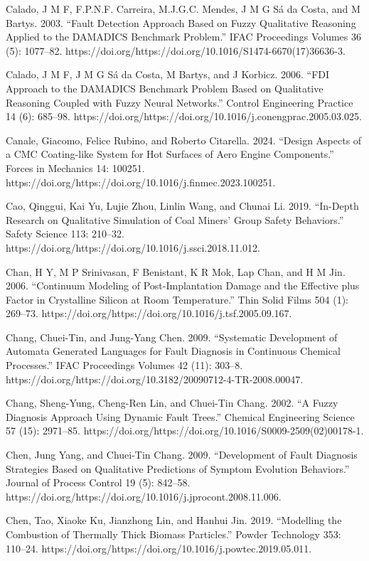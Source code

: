 \documentclass[utf8]{gradu3}
\begin{document}
Calado, J M F, F.P.N.F. Carreira, M.J.G.C. Mendes, J M G Sá da Costa, and M Bartys. 2003. “Fault Detection Approach Based on Fuzzy Qualitative Reasoning Applied to the DAMADICS Benchmark Problem.” IFAC Proceedings Volumes 36 (5): 1077–82. https://doi.org/https://doi.org/10.1016/S1474-6670(17)36636-3.

Calado, J M F, J M G Sá da Costa, M Bartys, and J Korbicz. 2006. “FDI Approach to the DAMADICS Benchmark Problem Based on Qualitative Reasoning Coupled with Fuzzy Neural Networks.” Control Engineering Practice 14 (6): 685–98. https://doi.org/https://doi.org/10.1016/j.conengprac.2005.03.025.

Canale, Giacomo, Felice Rubino, and Roberto Citarella. 2024. “Design Aspects of a CMC Coating-like System for Hot Surfaces of Aero Engine Components.” Forces in Mechanics 14: 100251. https://doi.org/https://doi.org/10.1016/j.finmec.2023.100251.

Cao, Qinggui, Kai Yu, Lujie Zhou, Linlin Wang, and Chunai Li. 2019. “In-Depth Research on Qualitative Simulation of Coal Miners’ Group Safety Behaviors.” Safety Science 113: 210–32. https://doi.org/https://doi.org/10.1016/j.ssci.2018.11.012.

Chan, H Y, M P Srinivasan, F Benistant, K R Mok, Lap Chan, and H M Jin. 2006. “Continuum Modeling of Post-Implantation Damage and the Effective plus Factor in Crystalline Silicon at Room Temperature.” Thin Solid Films 504 (1): 269–73. https://doi.org/https://doi.org/10.1016/j.tsf.2005.09.167.

Chang, Chuei-Tin, and Jung-Yang Chen. 2009. “Systematic Development of Automata Generated Languages for Fault Diagnosis in Continuous Chemical Processes.” IFAC Proceedings Volumes 42 (11): 303–8. https://doi.org/https://doi.org/10.3182/20090712-4-TR-2008.00047.

Chang, Sheng-Yung, Cheng-Ren Lin, and Chuei-Tin Chang. 2002. “A Fuzzy Diagnosis Approach Using Dynamic Fault Trees.” Chemical Engineering Science 57 (15): 2971–85. https://doi.org/https://doi.org/10.1016/S0009-2509(02)00178-1.

Chen, Jung Yang, and Chuei-Tin Chang. 2009. “Development of Fault Diagnosis Strategies Based on Qualitative Predictions of Symptom Evolution Behaviors.” Journal of Process Control 19 (5): 842–58. https://doi.org/https://doi.org/10.1016/j.jprocont.2008.11.006.

Chen, Tao, Xiaoke Ku, Jianzhong Lin, and Hanhui Jin. 2019. “Modelling the Combustion of Thermally Thick Biomass Particles.” Powder Technology 353: 110–24. https://doi.org/https://doi.org/10.1016/j.powtec.2019.05.011.
\end{document}
